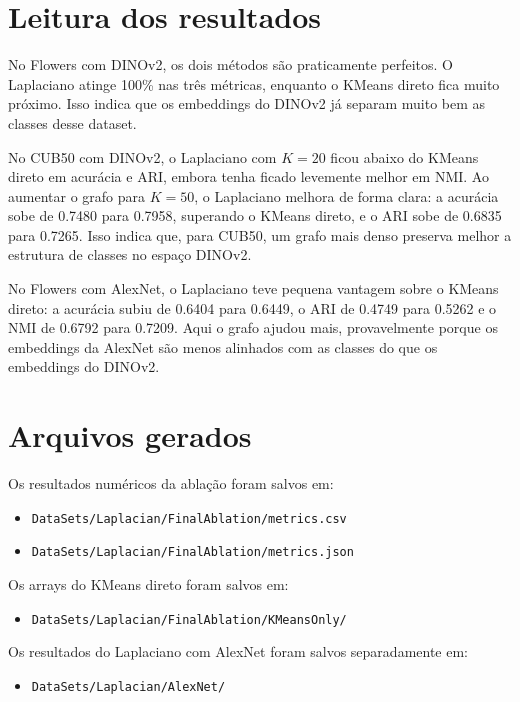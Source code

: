\documentclass[11pt,a4paper]{article}
\begin{document}
\section{Leitura dos resultados}

No Flowers com DINOv2, os dois métodos são praticamente perfeitos. O Laplaciano
atinge 100\% nas três métricas, enquanto o KMeans direto fica muito próximo.
Isso indica que os embeddings do DINOv2 já separam muito bem as classes desse
dataset.

No CUB50 com DINOv2, o Laplaciano com \(K=20\) ficou abaixo do KMeans direto em
acurácia e ARI, embora tenha ficado levemente melhor em NMI. Ao aumentar o grafo
para \(K=50\), o Laplaciano melhora de forma clara: a acurácia sobe de 0.7480
para 0.7958, superando o KMeans direto, e o ARI sobe de 0.6835 para 0.7265.
Isso indica que, para CUB50, um grafo mais denso preserva melhor a estrutura de
classes no espaço DINOv2.

No Flowers com AlexNet, o Laplaciano teve pequena vantagem sobre o KMeans direto:
a acurácia subiu de 0.6404 para 0.6449, o ARI de 0.4749 para 0.5262 e o NMI de
0.6792 para 0.7209. Aqui o grafo ajudou mais, provavelmente porque os embeddings
da AlexNet são menos alinhados com as classes do que os embeddings do DINOv2.

\section{Arquivos gerados}

Os resultados numéricos da ablação foram salvos em:

\begin{itemize}
    \item \texttt{DataSets/Laplacian/FinalAblation/metrics.csv}
    \item \texttt{DataSets/Laplacian/FinalAblation/metrics.json}
\end{itemize}

Os arrays do KMeans direto foram salvos em:

\begin{itemize}
    \item \texttt{DataSets/Laplacian/FinalAblation/KMeansOnly/}
\end{itemize}

Os resultados do Laplaciano com AlexNet foram salvos separadamente em:

\begin{itemize}
    \item \texttt{DataSets/Laplacian/AlexNet/}
\end{itemize}
\end{document}
